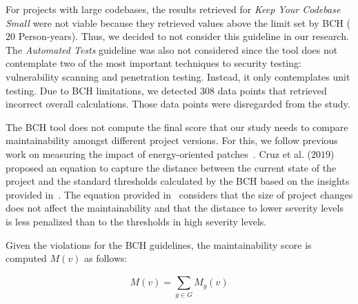 \documentclass[smallextended]{svjour3}       %
\begin{document}
For projects with large codebases, the results retrieved for 
\emph{Keep Your Codebase Small} were not viable because they 
retrieved values above the limit set by BCH ($20$ Person-years). Thus, 
we decided to not consider this guideline in our research. The 
\emph{Automated Tests} guideline was also not considered since the 
tool does not contemplate two of the most important techniques to 
security testing: vulnerability scanning and penetration testing. 
Instead, it only contemplates unit testing. Due to BCH limitations, 
we detected $308$ data points that retrieved incorrect overall 
calculations. Those data points were disregarded from the study.

The BCH tool does not compute the final score that our study needs 
to compare maintainability amongst different project versions. For 
this, we follow previous work on measuring the impact of 
energy-oriented patches~\cite{8919169}. Cruz et al. ($2019$) 
proposed an equation to capture the distance between the current 
state of the project and the standard thresholds calculated by the 
BCH based on the insights provided in~\cite{Olivari:2018}. The 
equation provided in~\cite{8919169} considers that the size of 
project changes does not affect the maintainability and that the 
distance to lower severity levels is less penalized than to the
thresholds in high severity levels.



Given the violations for the BCH guidelines, the maintainability 
score is computed $M(v)$ as follows:

\begin{equation}
    M(v) = \sum_{g \in G}^{} M_{g}(v)
\end{equation}
\end{document}
